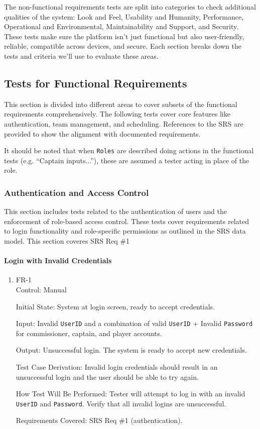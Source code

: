 \documentclass[12pt, titlepage]{article}
\begin{document}
The non-functional requirements tests are split into categories to check additional qualities of the system: Look and Feel, Usability and Humanity, Performance, Operational and Environmental, Maintainability and Support, and Security. These tests make sure the platform isn’t just functional but also user-friendly, reliable, compatible across devices, and secure. Each section breaks down the tests and criteria we’ll use to evaluate these areas.

\subsection{Tests for Functional Requirements}

This section is divided into different areas to cover subsets of the functional requirements comprehensively. The following tests cover core features like authentication, team management, and scheduling. References to the SRS are provided to show the alignment with documented requirements.

It should be noted that when \texttt{Roles} are described doing actions in the functional tests (e.g. ``Captain inputs...''), these are assumed a tester acting in place of the role.

\subsubsection{Authentication and Access Control}

This section includes tests related to the authentication of users and the enforcement of role-based access control. These tests cover requirements related to login functionality and role-specific permissions as outlined in the SRS data model. This section coveres SRS Req \#1

\paragraph{Login with Invalid Credentials}

\begin{enumerate}
  \item{FR-1\\}
        Control: Manual

        Initial State: System at login screen, ready to accept credentials.

        Input: Invalid \texttt{UserID} and a combination of valid \texttt{UserID} + Invalid \texttt{Password} for commissioner, captain, and player accounts.

        Output: Unsuccessful login. The system is ready to accept new credentials.

        Test Case Derivation: Invalid login credentials should result in an unsuccessful login and the user should be able to try again.

        How Test Will Be Performed: Tester will attempt to log in with an invalid \texttt{UserID} and \texttt{Password}. Verify that all invalid logins are unsuccessful.

        Requirements Covered: SRS Req \#1 (authentication).
\end{enumerate}
\end{document}
